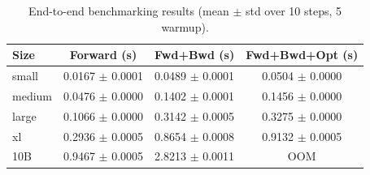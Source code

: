 \begin{table}
\caption{End-to-end benchmarking results (mean $\pm$ std over 10 steps, 5 warmup).}
\label{tab:benchmarking}
\begin{tabular}{lccc}
\toprule
Size & Forward (s) & Fwd+Bwd (s) & Fwd+Bwd+Opt (s) \\
\midrule
small & 0.0167 $\pm$ 0.0001 & 0.0489 $\pm$ 0.0001 & 0.0504 $\pm$ 0.0000 \\
medium & 0.0476 $\pm$ 0.0000 & 0.1402 $\pm$ 0.0001 & 0.1456 $\pm$ 0.0000 \\
large & 0.1066 $\pm$ 0.0000 & 0.3142 $\pm$ 0.0005 & 0.3275 $\pm$ 0.0000 \\
xl & 0.2936 $\pm$ 0.0005 & 0.8654 $\pm$ 0.0008 & 0.9132 $\pm$ 0.0005 \\
10B & 0.9467 $\pm$ 0.0005 & 2.8213 $\pm$ 0.0011 & OOM \\
\bottomrule
\end{tabular}
\end{table}
